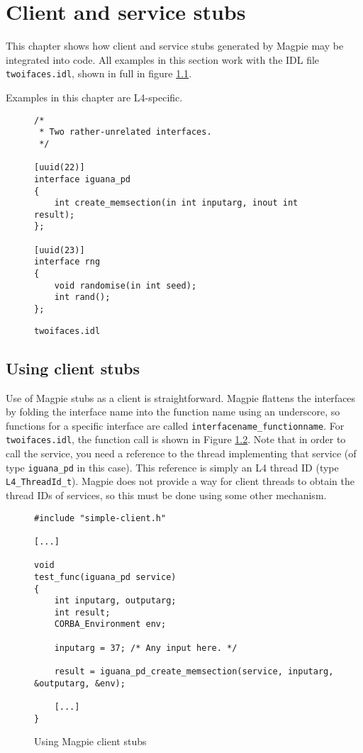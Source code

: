 \chapter{Client and service stubs}
\label{chapter.stubs}

This chapter shows how client and service stubs generated by Magpie may be integrated into code. All examples in this section work with the IDL file {\tt twoifaces.idl}, shown in full in figure \ref{figure.twoifaces.idl}.

Examples in this chapter are L4-specific.

\begin{figure}
\begin{verbatim}
/*
 * Two rather-unrelated interfaces.
 */

[uuid(22)]
interface iguana_pd
{
    int create_memsection(in int inputarg, inout int result);
};

[uuid(23)]
interface rng
{
    void randomise(in int seed);
    int rand();
};
\end{verbatim}
\caption{{\tt twoifaces.idl}}
\label{figure.twoifaces.idl}
\end{figure}

\section{Using client stubs}

Use of Magpie stubs as a client is straightforward. Magpie flattens the interfaces by folding the interface name into the function name using an underscore, so functions for a specific interface are called {\tt interfacename\_functionname}. For {\tt twoifaces.idl}, the function call is shown in Figure \ref{figure.stub.client.example}. Note that in order to call the service, you need a reference to the thread implementing that service (of type {\tt iguana\_pd} in this case). This reference is simply an L4 thread ID (type {\tt L4\_ThreadId\_t}). Magpie does not provide a way for client threads to obtain the thread IDs of services, so this must be done using some other mechanism.

\begin{figure}
\begin{verbatim}
#include "simple-client.h"

[...]

void
test_func(iguana_pd service)
{
    int inputarg, outputarg;
    int result;
    CORBA_Environment env;

    inputarg = 37; /* Any input here. */
    
    result = iguana_pd_create_memsection(service, inputarg, &outputarg, &env);

    [...]
}
\end{verbatim}
\caption{Using Magpie client stubs}
\label{figure.stub.client.example}
\end{figure}

